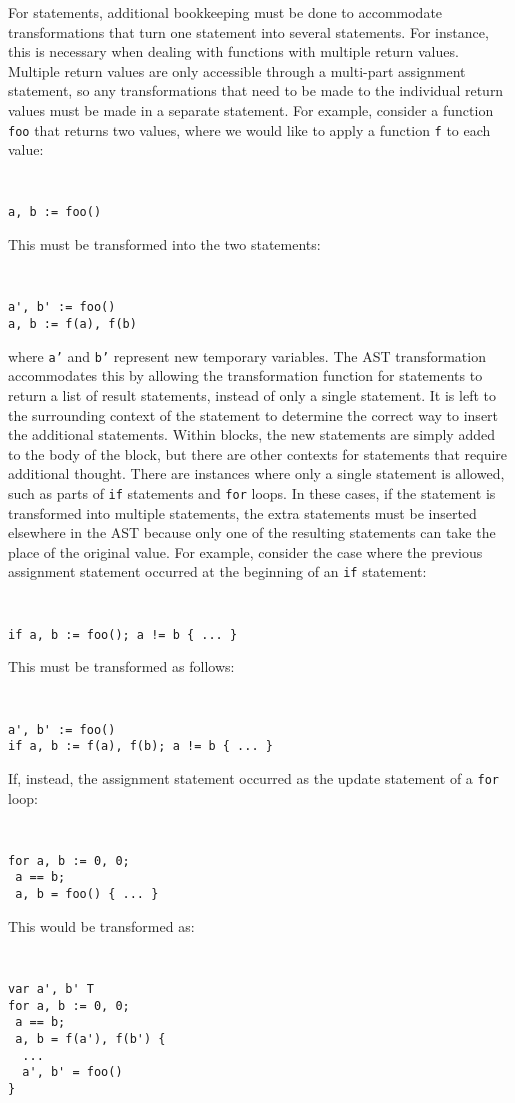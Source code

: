 \documentclass[letterpaper,twocolumn,11pt]{article}
\begin{document}
For statements, additional bookkeeping must be done to accommodate transformations that turn one statement into several statements. For instance, this is necessary when dealing with functions with multiple return values. Multiple return values are only accessible through a multi-part assignment statement, so any transformations that need to be made to the individual return values must be made in a separate statement. For example, consider a function \texttt{foo} that returns two values, where we would like to apply a function \texttt{f} to each value:
{ \tt \small
\begin{verbatim}
a, b := foo()
\end{verbatim}
}
This must be transformed into the two statements:
{ \tt \small
\begin{verbatim}
a', b' := foo()
a, b := f(a), f(b)
\end{verbatim}
}
where \texttt{a'} and \texttt{b'} represent new temporary variables. The AST transformation accommodates this by allowing the transformation function for statements to return a list of result statements, instead of only a single statement. It is left to the surrounding context of the statement to determine the correct way to insert the additional statements. Within blocks, the new statements are simply added to the body of the block, but there are other contexts for statements that require additional thought. There are instances where only a single statement is allowed, such as parts of \texttt{if} statements and \texttt{for} loops. In these cases, if the statement is transformed into multiple statements, the extra statements must be inserted elsewhere in the AST because only one of the resulting statements can take the place of the original value. For example, consider the case where the previous assignment statement occurred at the beginning of an \texttt{if} statement:
{ \tt \small
\begin{verbatim}
if a, b := foo(); a != b { ... }
\end{verbatim} 
}

This must be transformed as follows:
{ \tt \small
\begin{verbatim}
a', b' := foo()
if a, b := f(a), f(b); a != b { ... }
\end{verbatim}
}

If, instead, the assignment statement occurred as the update statement of a \texttt{for} loop:
{ \tt \small
\begin{verbatim}
for a, b := 0, 0;
 a == b;
 a, b = foo() { ... }
\end{verbatim} 
}
This would be transformed as:
{ \tt \small
\begin{verbatim}
var a', b' T
for a, b := 0, 0;
 a == b;
 a, b = f(a'), f(b') {
  ...
  a', b' = foo()
}
\end{verbatim} 
}
\end{document}
